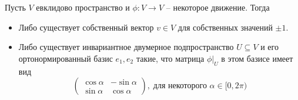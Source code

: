 \begin{claim}\label{claim::OrthotInvarSub}
Пусть $V$ евклидово пространство и $\phi \colon V\to V$ -- некоторое движение. Тогда
\begin{itemize}
\item Либо существует собственный вектор $v\in V$ для собственных значений $\pm 1$.
\item Либо существует инвариантное двумерное подпространство $U\subseteq V$ и его ортонормированный базис $e_1, e_2$ такие, что матрица $\phi|_U$ в этом базисе имеет вид
\[
\begin{pmatrix}
{\cos \alpha}&{-\sin \alpha}\\
{\sin \alpha}&{\cos \alpha}
\end{pmatrix}
,\;\text{для некоторого $\alpha \in [0,2\pi)$}
\]
\end{itemize}
\end{claim}
